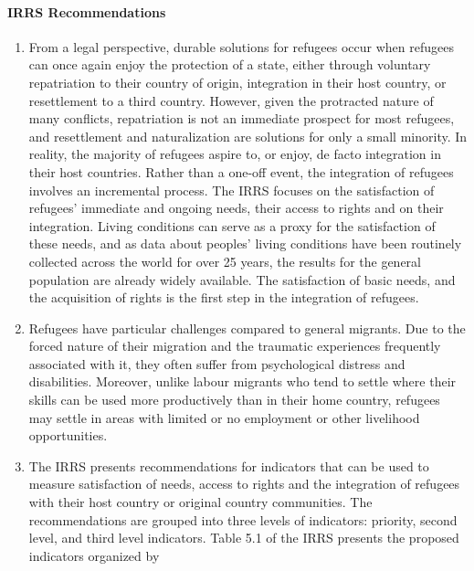 \documentclass[
]{article}
\begin{document}
\hypertarget{irrs-recommendations}{%
\paragraph{IRRS Recommendations}\label{irrs-recommendations}}

\begin{enumerate}
\def\labelenumi{\arabic{enumi}.}
\setcounter{enumi}{428}
\item
  From a legal perspective, durable solutions for refugees occur when
  refugees can once again enjoy the protection of a state, either
  through voluntary repatriation to their country of origin,
  integration in their host country, or resettlement to a third
  country. However, given the protracted nature of many conflicts,
  repatriation is not an immediate prospect for most refugees, and
  resettlement and naturalization are solutions for only a small
  minority. In reality, the majority of refugees aspire to, or enjoy,
  de facto integration in their host countries. Rather than a one-off
  event, the integration of refugees involves an incremental process.
  The IRRS focuses on the satisfaction of refugees' immediate and
  ongoing needs, their access to rights and on their integration.
  Living conditions can serve as a proxy for the satisfaction of these
  needs, and as data about peoples' living conditions have been
  routinely collected across the world for over 25 years, the results
  for the general population are already widely available. The
  satisfaction of basic needs, and the acquisition of rights is the
  first step in the integration of refugees.
\item
  Refugees have particular challenges compared to general migrants.
  Due to the forced nature of their migration and the traumatic
  experiences frequently associated with it, they often suffer from
  psychological distress and disabilities. Moreover, unlike labour
  migrants who tend to settle where their skills can be used more
  productively than in their home country, refugees may settle in
  areas with limited or no employment or other livelihood
  opportunities.
\item
  The IRRS presents recommendations for indicators that can be used
  to measure satisfaction of needs, access to rights and the
  integration of refugees with their host country or original country
  communities. The recommendations are grouped into three levels of
  indicators: priority, second level, and third level indicators.
  Table 5.1 of the IRRS presents the proposed indicators organized by

\end{enumerate}
\end{document}
